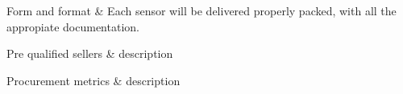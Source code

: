 \begin{table}[H]
\begin{tabular}
		Form and format & Each sensor will be delivered properly packed, with all the appropiate documentation.\\
		\hline
		
		Pre qualified sellers & description\\
		\hline
		
		Procurement metrics & description\\
		
		\bottomrule[2pt]		
		
	\end{tabular}
	\caption{SOW 5.1.1: Manufacturing of payload sensors}
\end{table}


